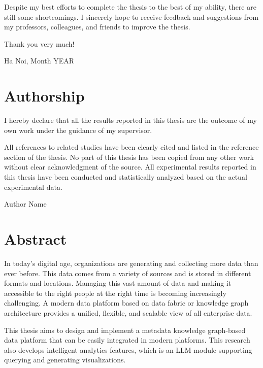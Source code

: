 \documentclass[12pt,a4paper,oneside]{book}
\theoremstyle{plain}
\begin{document}
Despite my best efforts to complete the thesis to the best of my ability, there are still some shortcomings. I sincerely hope to receive feedback and suggestions from my professors, colleagues, and friends to improve the thesis.

Thank you very much!

\vspace{1cm}
\hfill Ha Noi, Month YEAR

\clearpage

\chapter*{Authorship}

I hereby declare that all the results reported in this thesis are the outcome of my own work under the guidance of my supervisor.

All references to related studies have been clearly cited and listed in the reference section of the thesis. No part of this thesis has been copied from any other work without clear acknowledgment of the source. All experimental results reported in this thesis have been conducted and statistically analyzed based on the actual experimental data.

\vspace{2cm}
\hfill Author Name

\clearpage

\chapter*{Abstract}

In today's digital age, organizations are generating and collecting more data than ever before. This data comes from a variety of sources and is stored in different formats and locations. Managing this vast amount of data and making it accessible to the right people at the right time is becoming increasingly challenging. A modern data platform based on data fabric or knowledge graph architecture provides a unified, flexible, and scalable view of all enterprise data.

This thesis aims to design and implement a metadata knowledge graph-based data platform that can be easily integrated in modern platforms. This research also develops intelligent analytics features, which is an LLM module supporting querying and generating visualizations.
\end{document}
